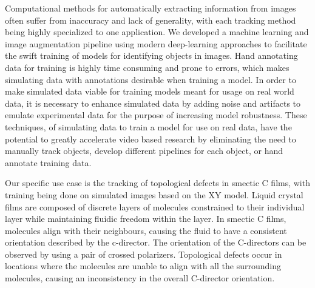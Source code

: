 \documentclass[prl,reprint,showpacs,floatfix,nofootinbib]{revtex4-1}
\begin{document}
Computational methods for automatically extracting information from images often suffer from inaccuracy and lack of generality, with each tracking method being highly specialized to one application. We developed a machine learning and image augmentation pipeline using modern deep-learning approaches to facilitate the swift training of models for identifying objects in images. Hand annotating data for training is highly time consuming and prone to errors, which makes simulating data with annotations desirable when training a model. In order to make simulated data viable for training models meant for usage on real world data, it is necessary to enhance simulated data by adding noise and artifacts to emulate experimental data for the purpose of increasing model robustness. These techniques, of simulating data to train a model for use on real data, have the potential to greatly accelerate video based research by eliminating the need to manually track objects, develop different pipelines for each object, or hand annotate training data. %

Our specific use case is the tracking of topological defects in smectic C films, with training being done on simulated images based on the XY model. Liquid crystal films are composed of discrete layers of molecules constrained to their individual layer while maintaining fluidic freedom within the layer. In smectic C films, molecules align with their neighbours, causing the fluid to have a consistent orientation described by the c-director. The orientation of the C-directors can be observed by using a pair of crossed polarizers. Topological defects occur in locations where the molecules are unable to align with all the surrounding molecules, causing an inconsistency in the overall C-director orientation. 


\end{document}
